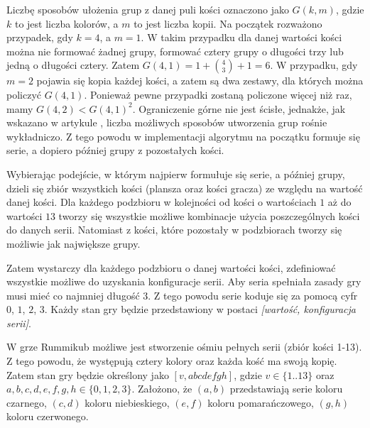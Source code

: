  Liczbę sposobów ułożenia grup z danej puli kości oznaczono jako $G(k, m)$, gdzie $k$ to jest liczba kolorów, a $m$ to jest liczba kopii. Na początek %
 rozważono przypadek, gdy $k = 4$, a $m = 1$. W takim przypadku dla danej wartości kości można nie formować żadnej grupy, formować cztery grupy o długości trzy lub jedną o długości cztery. Zatem $G(4,1) = 1 + {{4}\choose{3}} + 1 = 6$. W przypadku, gdy $m = 2$ pojawia się kopia każdej kości, a zatem są dwa zestawy, dla których można policzyć $G(4,1)$. %
Ponieważ pewne przypadki zostaną policzone więcej niż raz, mamy  $G(4,2) < G(4,1)^2$.
  Ograniczenie górne nie jest ścisłe, jednakże, jak wskazano w artykule \cite{RummikubComplexity},  liczba możliwych sposobów utworzenia grup rośnie 
  wykładniczo. %
   Z tego powodu w implementacji algorytmu na początku formuje się serie, a dopiero później grupy z pozostałych kości. 

Wybierając podejście, w którym najpierw formułuje się serie, a później grupy, dzieli się zbiór wszystkich kości (plansza oraz kości gracza) ze względu na wartość danej kości. Dla każdego podzbioru w kolejności od kości o wartościach $1$ aż do wartości $13$ tworzy się wszystkie możliwe kombinacje użycia poszczególnych kości do danych serii. Natomiast z kości, które pozostały w podzbiorach tworzy się możliwie jak największe grupy. 

Zatem wystarczy dla każdego podzbioru o danej wartości kości, zdefiniować wszystkie możliwe do uzyskania konfiguracje serii. Aby seria spełniała zasady gry musi mieć co najmniej długość $3$. Z tego powodu serie koduje się za pomocą cyfr $0$, $1$, $2$, $3$. Każdy stan gry będzie przedstawiony w postaci \emph{[wartość, konfiguracja serii]}. %

W grze Rummikub możliwe jest stworzenie ośmiu pełnych serii (zbiór kości 1-13). Z tego powodu, że występują cztery kolory oraz każda kość ma swoją kopię. Zatem stan gry będzie określony jako $[v, abcdefgh]$, gdzie $v \in \{1..13\}$ oraz %
$a, b, c, d, e, f, g, h \in \{0, 1, 2, 3\}$.
 Założono, że $(a, b)$ przedstawiają serie koloru czarnego, $(c, d)$ koloru niebieskiego, $(e, f)$ koloru pomarańczowego, $(g, h)$ koloru czerwonego. 
 
